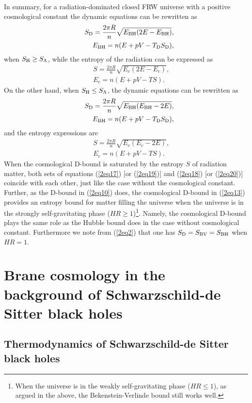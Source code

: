 \documentclass[a4paper,12pt]{article}
\newcommand{\sect}[1]{\setcounter{equation}{0}\section{#1}}
\begin{document}
In summary, for a radiation-dominated closed FRW universe with a
positive cosmological constant the dynamic equations can be
rewritten as
\begin{eqnarray}
\label{2eq17}
 && S_{\rm D}=\frac{2\pi R}{n}\sqrt{E_{\rm
BH}(2E-E_{\rm
BH})}, \nonumber \\
&& E_{\rm BH}=n(E+pV -T_{\rm D} S_{\rm D}),
\end{eqnarray}
when $S_{\rm H} \ge S_{\Lambda}$, while the entropy of the
radiation can be expressed as
\begin{eqnarray}
\label{2eq18}
&& S =\frac{2\pi R}{n}\sqrt{E_c(2E-E_c)},
  \nonumber \\
&& E_c=n(E+pV -T S).
\end{eqnarray}
On the other hand, when $S_{\rm H} \le S_{\rm \Lambda}$, the
dynamic equations can be rewritten as
\begin{eqnarray}
\label{2eq19}
 && S_{\rm D}=\frac{2\pi R}{n}\sqrt{E_{\rm
BH}(E_{\rm
BH}-2E )}, \nonumber \\
&& E_{\rm BH}=n(E+pV -T_{\rm D} S_{\rm D}),
\end{eqnarray}
and the entropy expressions are
\begin{eqnarray}
\label{2eq20}
 && S =\frac{2\pi R}{n}\sqrt{E_c(E_c-2E)},
  \nonumber \\
&& E_c=n(E+pV -T S).
\end{eqnarray}
When the cosmological D-bound is saturated by the
entropy $S$ of radiation matter, both sets of equations (\ref{2eq17}) [or
(\ref{2eq19})] and (\ref{2eq18}) [or (\ref{2eq20})] coincide with
each other, just like the case without the cosmological constant. Further,
as the D-bound in (\ref{2eq10}) does, the cosmological D-bound in (\ref{2eq13}) 
provides an entropy bound for matter filling the universe when the universe
is in the strongly self-gravitating phase ($HR\ge 1$)\footnote{When the universe is in
the weakly self-gravitating phase ($HR \le 1$), as argued in the above, the 
Bekenstein-Verlinde bound still works well.}. Namely, the cosmological D-bound
plays the same role as the Hubble bound does in the case without cosmological 
constant. Furthermore we note from (\ref{2eq2}) that one has $S_{\rm D}=
S_{\rm BV}=S_{\rm BH}$ when $HR=1$.



\sect{Brane cosmology in the background of Schwarzschild-de Sitter
black holes}

\subsection{Thermodynamics of Schwarzschild-de Sitter black holes}
\end{document}
